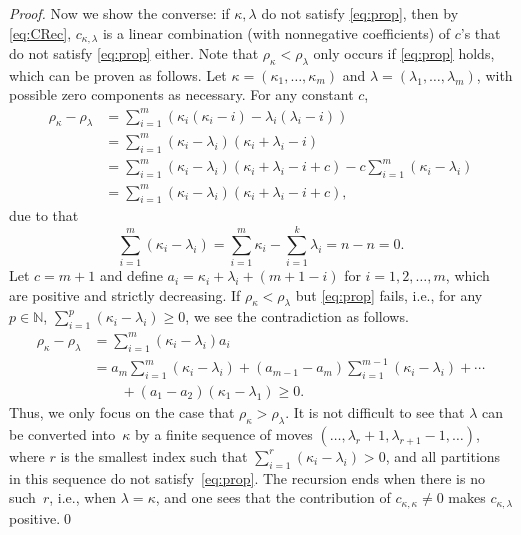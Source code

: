 \documentclass[smallextended]{svjour3}
\begin{document}
\begin{proof}
  Now we show the converse: if $\kappa,\lambda$ do not satisfy
  \eqref{eq:prop}, then by \eqref{eq:CRec}, $c_{\kappa,\lambda}$ is a linear
  combination (with nonnegative coefficients) of $c$'s that do not satisfy
  \eqref{eq:prop} either.  Note that $\rho_\kappa<\rho_\lambda$ only occurs if
  \eqref{eq:prop} holds, which can be proven as follows. Let $\kappa=(\kappa_{1},\ldots,\kappa_{m})$ and $\lambda=(\lambda_{1},\ldots,\lambda_{m})$, with possible zero components as necessary. For any constant $c$, 
\begin{align*}
\rho_{\kappa}-\rho_{\lambda} & =\sum_{i=1}^{m}\left(\kappa_{i}(\kappa_{i}-i)-\lambda_{i}(\lambda_{i}-i)\right)\\
 & =\sum_{i=1}^{m}(\kappa_{i}-\lambda_{i})(\kappa_{i}+\lambda_{i}-i)\\
 & =\sum_{i=1}^{m}(\kappa_{i}-\lambda_{i})(\kappa_{i}+\lambda_{i}-i+c)-c\sum_{i=1}^{m}(\kappa_{i}-\lambda_{i})\\
 & = \sum_{i=1}^{m}(\kappa_{i}-\lambda_{i})(\kappa_{i}+\lambda_{i}-i+c),
\end{align*}
due to that 
\[
\sum_{i=1}^{m}(\kappa_{i}-\lambda_{i})=\sum_{i=1}^{m}\kappa_{i}-\sum_{i=1}^{k}\lambda_{i}=n-n=0.
\]
Let $c=m+1$ and define $a_i=\kappa_{i}+\lambda_{i}+(m+1-i)$ for $i=1,2,\ldots,m$, which are positive and strictly decreasing. If $\rho_\kappa<\rho_\lambda$ but \eqref{eq:prop}  fails, i.e., for any $p\in\mathbb{N}$, $\sum_{i=1}^p(\kappa_i-\lambda_i)\geq 0$, we see the contradiction as follows.
\begin{align*}
\rho_{\kappa}-\rho_{\lambda} &= \sum_{i=1}^{m}(\kappa_{i}-\lambda_{i})a_{i}\\
  &= a_{m}\sum_{i=1}^{m}(\kappa_{i}-\lambda_{i})+(a_{m-1}-a_{m})\sum_{i=1}^{m-1}(\kappa_{i}-\lambda_{i})+\cdots\\
  &\qquad +(a_{1}-a_{2})(\kappa_{1}-\lambda_{1})\geq 0.
\end{align*}
Thus, we only focus on the case that $\rho_\kappa>\rho_\lambda$. It is not difficult to see that $\lambda$ can be
  converted into~$\kappa$ by a finite sequence of moves
  $(\dots,\lambda_r+1,\lambda_{r+1}-1,\dots)$, where $r$ is the smallest index
  such that $\sum_{i=1}^r (\kappa_i - \lambda_i) > 0$, and all partitions in
  this sequence do not satisfy~\eqref{eq:prop}. The recursion ends when there
  is no such~$r$, i.e., when $\lambda=\kappa$, and one sees that the
  contribution of $c_{\kappa,\kappa}\neq0$ makes $c_{\kappa,\lambda}$ positive.\qed
\end{proof}
\end{document}
